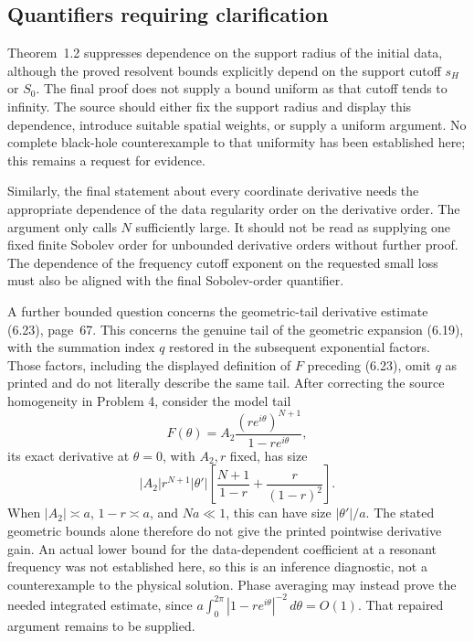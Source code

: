 \documentclass[10pt]{article}
\begin{document}
\subsection*{Quantifiers requiring clarification}
Theorem 1.2 suppresses dependence on the support radius of the initial data, although the proved resolvent bounds explicitly depend on the support cutoff \(s_H\) or \(S_0\). The final proof does not supply a bound uniform as that cutoff tends to infinity. The source should either fix the support radius and display this dependence, introduce suitable spatial weights, or supply a uniform argument. No complete black-hole counterexample to that uniformity has been established here; this remains a request for evidence.\par
Similarly, the final statement about every coordinate derivative needs the appropriate dependence of the data regularity order on the derivative order. The argument only calls \(N\) sufficiently large. It should not be read as supplying one fixed finite Sobolev order for unbounded derivative orders without further proof. The dependence of the frequency cutoff exponent on the requested small loss must also be aligned with the final Sobolev-order quantifier.\par
A further bounded question concerns the geometric-tail derivative estimate (6.23), page 67. This concerns the genuine tail of the geometric expansion (6.19), with the summation index \(q\) restored in the subsequent exponential factors. Those factors, including the displayed definition of \(F\) preceding (6.23), omit \(q\) as printed and do not literally describe the same tail. After correcting the source homogeneity in Problem 4, consider the model tail \[F(\theta)=A_2\frac{(re^{i\theta})^{N+1}}{1-re^{i\theta}},\] its exact derivative at \(\theta=0\), with \(A_2,r\) fixed, has size \[|A_2|r^{N+1}|\theta'|
 \left[\frac{N+1}{1-r}+\frac{r}{(1-r)^2}\right].\] When \(|A_2|\asymp a\), \(1-r\asymp a\), and \(Na\ll1\), this can have size \(|\theta'|/a\). The stated geometric bounds alone therefore do not give the printed pointwise derivative gain. An actual lower bound for the data-dependent coefficient at a resonant frequency was not established here, so this is an inference diagnostic, not a counterexample to the physical solution. Phase averaging may instead prove the needed integrated estimate, since \(a\int_0^{2\pi}|1-re^{i\theta}|^{-2}\,d\theta=O(1)\). That repaired argument remains to be supplied.\par
\end{document}
